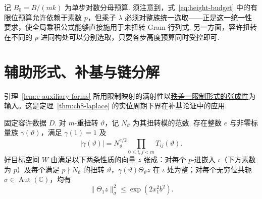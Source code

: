 记 $B_0=B/(mk)$ 为单步对数分母预算. 须注意到，式~\eqref{eq:height-budget} 中的有限位预算允许依赖于素数 $p$，但乘子 $\lambda$ 必须对整族统一选取——正是这一统一性要求，使全局乘积公式能够直接施用于未扭转 Gram 行列式. 另一方面，容许扭转在不同的 $p$-进同构处可以分别选取，只要各步高度预算同时受控即可.

\section{辅助形式、补基与链分解}
\label{sec:c-chain}

引理~\ref{lem:c-auxiliary-forms} 所用限制映射的满射性以\hyperref[use:ch8-restriction]{秩差一限制形式的张成性}为输入。这是定理~\ref{thm:ch8-laplace} 的实位周期下界在补基论证中的应用.

\begin{lemma}[具有整提升的辅助形式]
\label{lem:c-auxiliary-forms}
\emitthmsource
固定容许数据 $D$. 对 $m$-重扭转 $\vartheta$，记 $N_\vartheta$ 为其扭转模的范数. 存在整数 $e$ 与非零标量族 $\gamma(\vartheta)$，满足 $\gamma(1)=1$ 及
\[
 |\gamma(\vartheta)|
 =N_\vartheta^{e/2}\prod_{0\le i,j<m}T_{ij}(\vartheta).
\]
好目标空间 $W$ 由满足以下两条性质的向量 $z$ 张成：对每个 $p$-进嵌入 $\iota$（下方素数为 $p$）及每个满足 $p\nmid N_\vartheta$ 的扭转 $\vartheta$，$\gamma(\vartheta)\Theta_\vartheta z$ 在 $\iota$ 处为整；对每个无穷位共轭 $\sigma\in\operatorname{Aut}(\mathbb C)$，均有
\[
 \|\Theta_1 z\|_\sigma^2\le \exp(2x_1^2b^2).
\]
\end{lemma}
